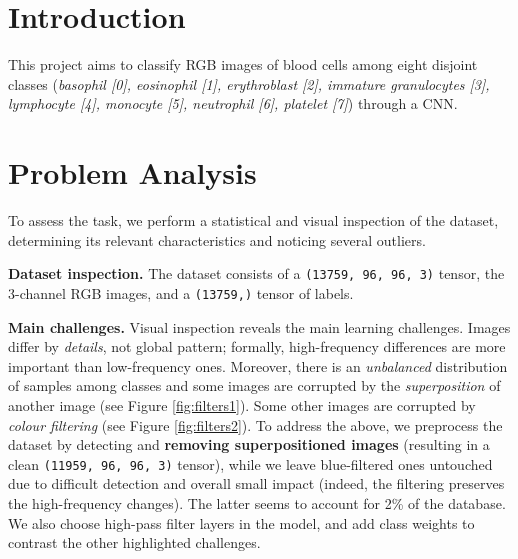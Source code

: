 \documentclass[11pt]{template}
\begin{document}
\head

\begin{multicols}{2}
       
\section{Introduction}
This project aims to classify RGB images of blood cells among eight disjoint classes (\emph{basophil [0], eosinophil [1], erythroblast [2], immature granulocytes [3], lymphocyte [4], monocyte [5], neutrophil [6], platelet [7]}) through a CNN.

\section{Problem Analysis}

To assess the task, we perform a statistical and visual inspection of the dataset, determining its relevant characteristics and noticing several outliers.

\textbf{Dataset inspection.}
The dataset consists of a \texttt{(13759, 96, 96, 3)} tensor, the 3-channel RGB images, and a \texttt{(13759,)} tensor of labels. 

\textbf{Main challenges.}
Visual inspection reveals the main learning challenges. Images differ by \textit{details}, not global pattern; formally, high-frequency differences are more important than low-frequency ones.
Moreover, there is an \emph{unbalanced} distribution of  samples among classes
and some images are corrupted by the \textit{superposition} of another image (see Figure \ref{fig:filters1}).
Some other images are corrupted by \textit{colour filtering} (see Figure \ref{fig:filters2}).
To address the above, we preprocess the dataset by detecting and \textbf{removing superpositioned images} (resulting in a clean \texttt{(11959, 96, 96, 3)} tensor), while we leave blue-filtered ones untouched due to difficult detection and overall small impact (indeed, the filtering preserves the high-frequency changes). The latter seems to account for 2\% of the database.
We also choose high-pass filter layers in the model, and add class weights to contrast the other highlighted challenges.


\end{multicols}
\end{document}

